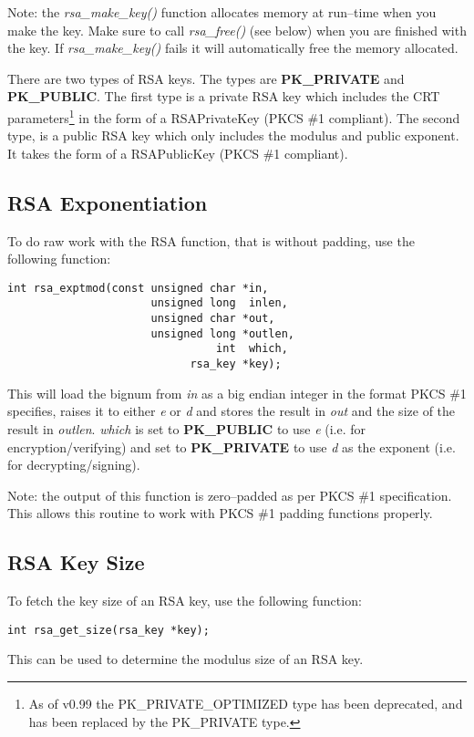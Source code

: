 \documentclass[synpaper]{book}
\begin{document}
Note: the \textit{rsa\_make\_key()} function allocates memory at run--time when you make the key.  Make sure to call
\textit{rsa\_free()} (see below) when you are finished with the key.  If \textit{rsa\_make\_key()} fails it will automatically
free the memory allocated.

 
There are two types of RSA keys.  The types are {\bf PK\_PRIVATE} and {\bf PK\_PUBLIC}.  The first type is a private
RSA key which includes the CRT parameters\footnote{As of v0.99 the PK\_PRIVATE\_OPTIMIZED type has been deprecated, and has been replaced by the
PK\_PRIVATE type.} in the form of a RSAPrivateKey (PKCS \#1 compliant).  The second type, is a public RSA key which only includes the modulus and public exponent.
It takes the form of a RSAPublicKey (PKCS \#1 compliant).

\subsection{RSA Exponentiation}
To do raw work with the RSA function, that is without padding, use the following function:
\begin{verbatim}
int rsa_exptmod(const unsigned char *in,
                      unsigned long  inlen,
                      unsigned char *out,
                      unsigned long *outlen,
                                int  which,
                            rsa_key *key);
\end{verbatim}
This will load the bignum from \textit{in} as a big endian integer in the format PKCS \#1 specifies, raises it to either \textit{e} or \textit{d} and stores the result
in \textit{out} and the size of the result in \textit{outlen}. \textit{which} is set to {\bf PK\_PUBLIC} to use \textit{e}
(i.e. for encryption/verifying) and set to {\bf PK\_PRIVATE} to use \textit{d} as the exponent (i.e. for decrypting/signing).

Note: the output of this function is zero--padded as per PKCS \#1 specification.  This allows this routine to work with PKCS \#1 padding functions properly.

\subsection{RSA Key Size}
To fetch the key size of an RSA key, use the following function:
\begin{verbatim}
int rsa_get_size(rsa_key *key);
\end{verbatim}
This can be used to determine the modulus size of an RSA key.
\end{document}
